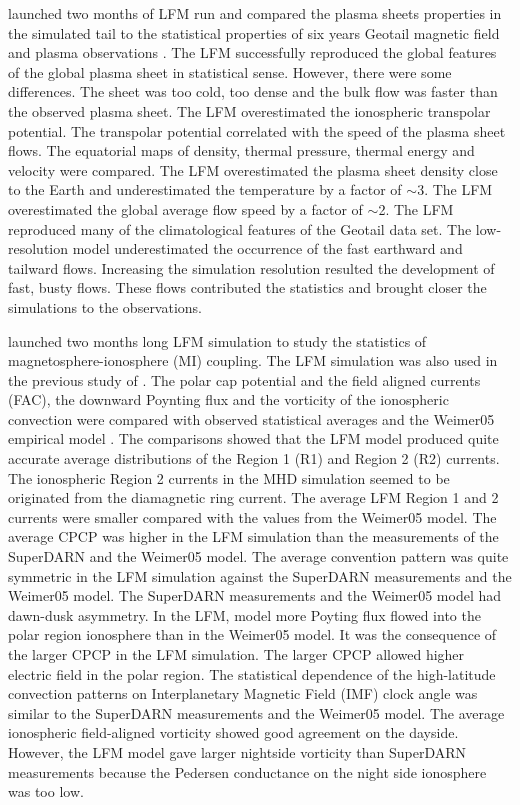\documentclass[linenumbers,draft]{agujournal}
\begin{document}
\citet{guild08:_geotail_lfm1,guild08:_geotail_lfm2} launched two months of LFM run and compared the plasma sheets properties in the simulated tail to the statistical properties of six years Geotail magnetic field and plasma observations \citep{kokubun94:_geotail_magnet_field_exper,mukai94:_low_energ_partic_lep_exper_geotail_satel}. The LFM successfully reproduced the global features of the global plasma sheet in statistical sense. However, there were some differences. The sheet was too cold, too dense and the bulk flow was faster than the observed plasma sheet. The LFM overestimated the ionospheric transpolar potential. The transpolar potential correlated with the speed of the plasma sheet flows. The equatorial maps of density, thermal pressure, thermal energy and velocity were compared. The LFM overestimated the plasma sheet density close to the Earth and underestimated the temperature by a factor of $\sim$3. The LFM overestimated the global average flow speed by a factor of $\sim$2. The LFM reproduced many of the climatological features of the Geotail data set. The low-resolution model underestimated the occurrence of the fast earthward and tailward flows. Increasing the simulation resolution resulted the development of fast, busty flows. These flows contributed the statistics and brought closer the simulations to the observations.

\citet{zhang11:_lyon_fedder_mobar_mhd} launched two months long LFM simulation to study the statistics of magnetosphere-ionosphere (MI) coupling. The LFM simulation was also used in the previous study of \citet{guild08:_geotail_lfm1}. The polar cap potential and the field aligned currents (FAC), the downward Poynting flux and the vorticity of the ionospheric convection were compared with observed statistical averages and the Weimer05 empirical model \citep{weimer05:_improv_joule}. The comparisons showed that the LFM model produced quite accurate average distributions of the Region 1 (R1) and Region 2 (R2) currents. The ionospheric Region 2 currents in the MHD simulation seemed to be originated from the diamagnetic ring current. The average LFM Region 1 and 2 currents were smaller compared with the values from the Weimer05 model. The average CPCP was higher in the LFM simulation than the measurements of the SuperDARN and the Weimer05 model. The average convention pattern was quite symmetric in the LFM simulation against the SuperDARN measurements and the Weimer05 model. The SuperDARN measurements and the Weimer05 model had dawn-dusk asymmetry. In the LFM, model more Poyting flux flowed into the polar region ionosphere than in the Weimer05 model. It was the consequence of the larger CPCP in the LFM simulation. The larger CPCP allowed higher electric field in the polar region. The statistical dependence of the high-latitude convection patterns on Interplanetary Magnetic Field (IMF) clock angle was similar to the SuperDARN measurements \citep{sofko95:_direc_super} and the Weimer05 model. The average ionospheric field-aligned vorticity showed good agreement on the dayside. However, the LFM model gave larger nightside vorticity than SuperDARN measurements because the Pedersen conductance on the night side ionosphere was too low. 
\end{document}
